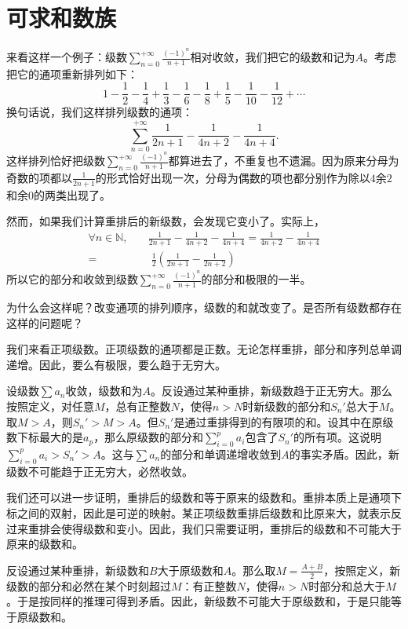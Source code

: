 \documentclass[12pt,UTF8]{ctexbook}
\begin{document}
\section{可求和数族}

来看这样一个例子：级数$\sum_{n=0}^{+\infty} \frac{(-1)^{n}}{n+1}$相对收敛，我们把它的级数和记为$A$。考虑把它的通项重新排列如下：
$$ 1 - \frac{1}{2} - \frac{1}{4} + \frac{1}{3} - \frac{1}{6} - \frac{1}{8} + \frac{1}{5} - \frac{1}{10} - \frac{1}{12} + \cdots $$
换句话说，我们这样排列级数的通项：
$$ \sum_{n=0}^{+\infty} \frac{1}{2n + 1} - \frac{1}{4n + 2} - \frac{1}{4n + 4}.$$
这样排列恰好把级数$\sum_{n=0}^{+\infty} \frac{(-1)^{n}}{n+1}$都算进去了，不重复也不遗漏。因为原来分母为奇数的项都以$\frac{1}{2n + 1}$的形式恰好出现一次，分母为偶数的项也都分别作为除以$4$余$2$和余$0$的两类出现了。

然而，如果我们计算重排后的新级数，会发现它变小了。实际上，
\begin{align*}
    \forall n \in \mathbb{N}, \quad &\frac{1}{2n + 1} - \frac{1}{4n + 2} - \frac{1}{4n + 4} = \frac{1}{4n + 2} - \frac{1}{4n + 4} \\
    =&\; \frac{1}{2} \left( \frac{1}{2n + 1} - \frac{1}{2n + 2}\right)
\end{align*}
所以它的部分和收敛到级数$\sum_{n=0}^{+\infty} \frac{(-1)^{n}}{n+1}$的部分和极限的一半。

为什么会这样呢？改变通项的排列顺序，级数的和就改变了。是否所有级数都存在这样的问题呢？

我们来看正项级数。正项级数的通项都是正数。无论怎样重排，部分和序列总单调递增。因此，要么有极限，要么趋于无穷大。

设级数$\sum a_n$收敛，级数和为$A$。反设通过某种重排，新级数趋于正无穷大。那么按照定义，对任意$M$，总有正整数$N$，使得$n>N$时新级数的部分和$S_n'$总大于$M$。取$M>A$，则$S_n'>M>A$。但$S_n'$是通过重排得到的有限项的和。设其中在原级数下标最大的是$a_p$，那么原级数的部分和$\sum_{i=0}^p a_i$包含了$S_n'$的所有项。这说明$\sum_{i=0}^p a_i>S_n'>A$。这与$\sum a_n$的部分和单调递增收敛到$A$的事实矛盾。因此，新级数不可能趋于正无穷大，必然收敛。

我们还可以进一步证明，重排后的级数和等于原来的级数和。重排本质上是通项下标之间的双射，因此是可逆的映射。某正项级数重排后级数和比原来大，就表示反过来重排会使得级数和变小。因此，我们只需要证明，重排后的级数和不可能大于原来的级数和。

反设通过某种重排，新级数和$B$大于原级数和$A$。那么取$M = \frac{A+B}{2}$，按照定义，新级数的部分和必然在某个时刻超过$M$：有正整数$N$，使得$n>N$时部分和总大于$M$。于是按同样的推理可得到矛盾。因此，新级数不可能大于原级数和，于是只能等于原级数和。
\end{document}
